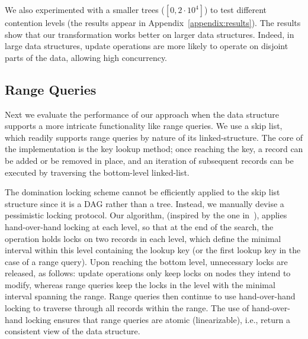We also experimented with a smaller trees ($[0,2\cdot10^4]$) to test different
contention levels (the results appear in Appendix~\ref{appendix:results}).
The results show that our transformation works better on larger data structures. 
Indeed, in large data structures, update operations are more likely to operate on disjoint parts
of the data, allowing high concurrency. 

\subsection{Range Queries}
\label{sec:range}

Next we evaluate the performance of our approach when the data
structure supports a more intricate functionality like range queries.
We use a skip list, which readily supports range queries by
nature of its linked-structure. The core of the implementation is the key lookup
method; once reaching the key, a record can be added or be removed in place, and
an iteration of subsequent records can be executed by traversing
the bottom-level linked-list.

The domination locking scheme cannot be efficiently applied to the skip list
structure since it is a DAG rather than a tree. Instead, we
manually devise a pessimistic locking protocol. Our
algorithm, (inspired by the one in~\cite{HerlihyS2008}), applies
hand-over-hand locking at each level, so that at the end of the search, the
operation holds locks on two records in each level, which define the minimal interval within this level
containing the lookup key (or the first lookup key in the case of a range query). Upon
reaching the bottom level, unnecessary locks are released, as follows: update operations only keep
locks on nodes they intend to modify, whereas
range
queries keep the locks in the level with the minimal interval spanning the
range. Range queries then continue to use hand-over-hand locking to traverse through all records
within the range. The use of hand-over-hand locking ensures that range queries are atomic
(linearizable), i.e., return a consistent view of the data structure.

